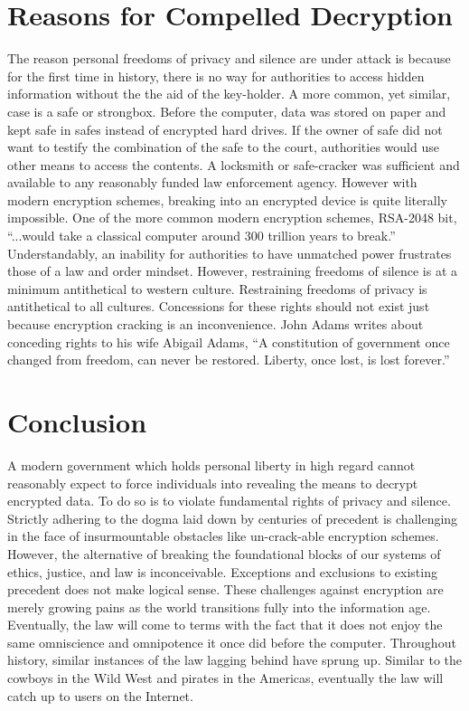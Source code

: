 \documentclass[format=sigconf]{acmart}
\begin{document}
\section{Reasons for Compelled Decryption}

The reason personal freedoms of privacy and silence are under attack is because for the first time in history, there is no way for authorities to access hidden information without the the aid of the key-holder. A more common, yet similar, case is a safe or strongbox. Before the computer, data was stored on paper and kept safe in safes instead of encrypted hard drives. If the owner of safe did not want to testify the combination of the safe to the court, authorities would use other means to access the contents. A locksmith or safe-cracker was sufficient and available to any reasonably funded law enforcement agency. However with modern encryption schemes, breaking into an encrypted device is quite literally impossible. One of the more common modern encryption schemes, RSA-2048 bit, ``...would take a classical computer around 300 trillion years to break.'' \cite{rsa} Understandably, an inability for authorities to have unmatched power frustrates those of a law and order mindset. However, restraining freedoms of silence is at a minimum  antithetical to western culture. Restraining freedoms of privacy is antithetical to all cultures. Concessions for these rights should not exist just because encryption cracking is an inconvenience. John Adams writes about conceding rights to his wife Abigail Adams, “A constitution of government once changed from freedom, can never be restored. Liberty, once lost, is lost forever.” \cite{adams}

\section{Conclusion}

A modern government which holds personal liberty in high regard cannot reasonably expect to force individuals into revealing the means to decrypt encrypted data. To do so is to violate fundamental rights of privacy and silence. Strictly adhering to the dogma laid down by centuries of precedent is challenging in the face of insurmountable obstacles like un-crack-able encryption schemes. However, the alternative of breaking the foundational blocks of our systems of ethics, justice, and law is inconceivable. Exceptions and exclusions to existing precedent does not make logical sense. These challenges against encryption are merely growing pains as the world transitions fully into the information age. Eventually, the law will come to terms with the fact that it does not enjoy the same omniscience and omnipotence it once did before the computer. Throughout history, similar instances of the law lagging behind have sprung up. Similar to the cowboys in the Wild West and pirates in the Americas, eventually the law will catch up to users on the Internet.


\medskip



\end{document}
